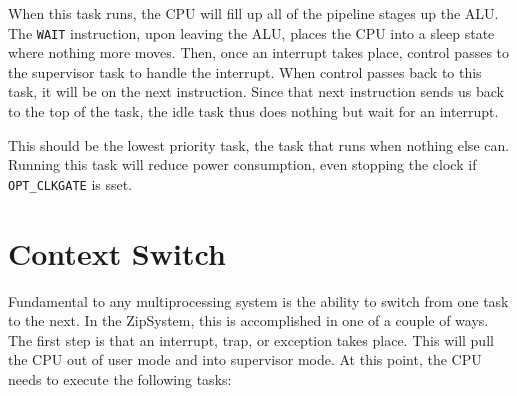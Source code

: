 \documentclass{gqtekspec}
\begin{document}
When this task runs, the CPU will fill up all of the pipeline stages up the
ALU.  The {\tt WAIT} instruction, upon leaving the ALU, places the CPU into
a sleep state where nothing more moves.  Then, once an interrupt takes place,
control passes to the supervisor task to handle the interrupt.  When control
passes back to this task, it will be on the next instruction.  Since that next
instruction sends us back to the top of the task, the idle task thus does
nothing but wait for an interrupt.

This should be the lowest priority task, the task that runs when nothing else
can.  Running this task will reduce power consumption, even stopping the
clock if {\tt OPT\_CLKGATE} is sset.

\section{Context Switch}
Fundamental to any multiprocessing system is the ability to switch from one
task to the next.  In the ZipSystem, this is accomplished in one of a couple of
ways.  The first step is that an interrupt, trap, or exception takes place.
This will pull the CPU out of user mode and into supervisor mode.  At this
point, the CPU needs to execute the following tasks:
\end{document}
